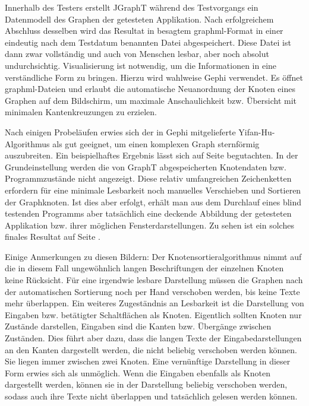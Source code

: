Innerhalb des Testers erstellt JGraphT während des Testvorgangs 
ein Datenmodell des Graphen der getesteten Applikation. Nach erfolgreichem
Abschluss desselben wird das Resultat in besagtem graphml-Format
in einer eindeutig nach dem Testdatum benannten Datei abgespeichert.
Diese Datei ist dann zwar vollständig und auch von Menschen lesbar,
aber noch absolut undurchsichtig. Visualisierung ist notwendig,
um die Informationen in eine verständliche Form zu bringen.
Hierzu wird wahlweise Gephi verwendet. Es öffnet graphml-Dateien
und erlaubt die automatische Neuanordnung der Knoten 
eines Graphen auf dem Bildschirm, um maximale Anschaulichkeit 
bzw. Übersicht mit minimalen Kantenkreuzungen zu erzielen.

Nach einigen Probeläufen erwies sich der in Gephi mitgelieferte 
Yifan-Hu-Algorithmus \cite{hu2005efficient} als gut geeignet,
um einen komplexen Graph sternförmig auszubreiten. Ein beispielhaftes
Ergebnis lässt sich auf Seite \pageref{fig:model_firstspirit_notext}
begutachten. In der Grundeinstellung werden die von GraphT
abgespeicherten Knotendaten bzw. Programmzustände nicht angezeigt.
Diese relativ umfangreichen Zeichenketten erfordern für eine minimale
Lesbarkeit noch manuelles Verschieben und Sortieren der Graphknoten.
Ist dies aber erfolgt, erhält man aus dem Durchlauf eines blind testenden
Programms aber tatsächlich eine deckende Abbildung der getesteten
Applikation bzw. ihrer möglichen Fensterdarstellungen. Zu sehen
ist ein solches finales Resultat auf Seite \pageref{fig:model_freespirit_06.10.2015}.

Einige Anmerkungen zu diesen Bildern: Der Knotensortieralgorithmus
nimmt auf die in diesem Fall ungewöhnlich langen Beschriftungen der einzelnen
Knoten keine Rücksicht. Für eine irgendwie lesbare Darstellung müssen die
Graphen nach der automatischen Sortierung noch per Hand verschoben werden,
bis keine Texte mehr überlappen. Ein weiteres Zugeständnis an Lesbarkeit
ist die Darstellung von Eingaben bzw. betätigter Schaltflächen als
Knoten. Eigentlich sollten Knoten nur Zustände darstellen, Eingaben
sind die Kanten bzw. Übergänge zwischen Zuständen. Dies führt aber dazu,
dass die langen Texte der Eingabedarstellungen an den Kanten dargestellt
werden, die nicht beliebig verschoben werden können. Sie liegen immer
zwischen zwei Knoten. Eine vernünftige Darstellung in dieser Form
erwies sich als unmöglich. Wenn die Eingaben ebenfalls als Knoten
dargestellt werden, können sie in der Darstellung beliebig verschoben
werden, sodass auch ihre Texte nicht überlappen und tatsächlich
gelesen werden können.


